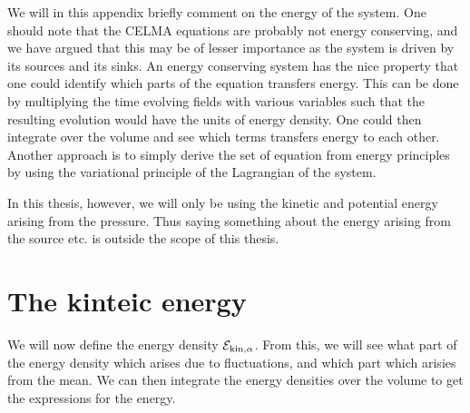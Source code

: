 We will in this appendix briefly comment on the energy of the system.
One should note that the CELMA equations are probably not energy conserving, and we have argued that this may be of lesser importance as the system is driven by its sources and its sinks.
An energy conserving system has the nice property that one could identify which parts of the equation transfers energy.
This can be done by multiplying the time evolving fields with various variables such that the resulting evolution would have the units of energy density.
One could then integrate over the volume and see which terms transfers energy to each other.
Another approach is to simply derive the set of equation from energy principles by using the variational principle of the Lagrangian of the system.

In this thesis, however, we will only be using the kinetic and potential energy arising from the pressure.
Thus saying something about the energy arising from the source etc. is outside the scope of this thesis.

\section{The kinteic energy}
%
We will now define the energy density $\mathcal{E}_{\text{kin},\alpha}$.
From this, we will see what part of the energy density which arises due to fluctuations, and which part which arisies from the mean.
We can then integrate the energy densities over the volume to get the expressions for the energy.

